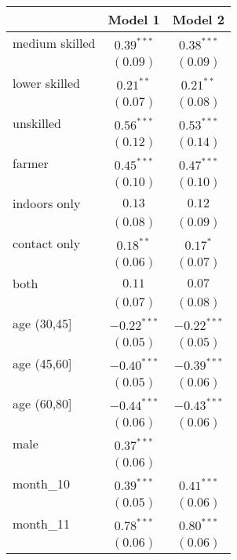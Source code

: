
\begin{table}[h!]
\begin{center}
\begin{small}
\begin{tabular}{l c c}
\hline
 & Model 1 & Model 2 \\
\hline
medium skilled & $0.39^{***}$  & $0.38^{***}$  \\
               & $(0.09)$      & $(0.09)$      \\
lower skilled  & $0.21^{**}$   & $0.21^{**}$   \\
               & $(0.07)$      & $(0.08)$      \\
unskilled      & $0.56^{***}$  & $0.53^{***}$  \\
               & $(0.12)$      & $(0.14)$      \\
farmer         & $0.45^{***}$  & $0.47^{***}$  \\
               & $(0.10)$      & $(0.10)$      \\
indoors only   & $0.13$        & $0.12$        \\
               & $(0.08)$      & $(0.09)$      \\
contact only   & $0.18^{**}$   & $0.17^{*}$    \\
               & $(0.06)$      & $(0.07)$      \\
both           & $0.11$        & $0.07$        \\
               & $(0.07)$      & $(0.08)$      \\
age (30,45]    & $-0.22^{***}$ & $-0.22^{***}$ \\
               & $(0.05)$      & $(0.05)$      \\
age (45,60]    & $-0.40^{***}$ & $-0.39^{***}$ \\
               & $(0.05)$      & $(0.06)$      \\
age (60,80]    & $-0.44^{***}$ & $-0.43^{***}$ \\
               & $(0.06)$      & $(0.06)$      \\
male           & $0.37^{***}$  &               \\
               & $(0.06)$      &               \\
month\_10      & $0.39^{***}$  & $0.41^{***}$  \\
               & $(0.05)$      & $(0.06)$      \\
month\_11      & $0.78^{***}$  & $0.80^{***}$  \\
               & $(0.06)$      & $(0.06)$      \\

\end{tabular}
\end{small}
\end{center}
\end{table}
